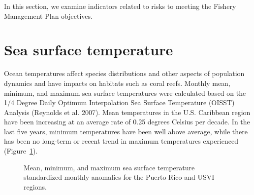 \documentclass[
  letterpaper,
  oneside,
  open=any]{scrbook}
\begin{document}
In this section, we examine indicators related to risks to meeting the
Fishery Management Plan objectives.

\section{Sea surface temperature}\label{sea-surface-temperature}

Ocean temperatures affect species distributions and other aspects of
population dynamics and have impacts on habitats such as coral reefs.
Monthly mean, minimum, and maximum sea surface temperatures were
calculated based on the 1/4 Degree Daily Optimum Interpolation Sea
Surface Temperature (OISST) Analysis (Reynolds et al. 2007). Mean
temperatures in the U.S. Caribbean region have been increasing at an
average rate of 0.25 degrees Celsius per decade. In the last five years,
minimum temperatures have been well above average, while there has been
no long-term or recent trend in maximum temperatures experienced
(Figure~\ref{fig-SST}).

\begin{figure}


\caption{\label{fig-SST}Mean, minimum, and maximum sea surface
temperature standardized monthly anomalies for the Puerto Rico and USVI
regions.}

\end{figure}%
\end{document}
